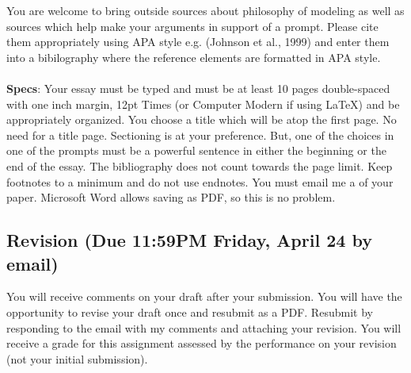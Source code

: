 \documentclass[12pt]{article}
\begin{document}
You are welcome to bring outside sources about philosophy of modeling as well as sources which help make your arguments in support of a prompt. Please cite them appropriately using APA style e.g. (Johnson et al., 1999) and enter them into a bibilography where the reference elements are formatted in APA style.\\
~\\
\textbf{Specs}: Your essay must be typed and must be at least 10 pages double-spaced with one inch margin, 12pt Times (or Computer Modern if using \LaTeX) and be appropriately organized. You choose a title which will be atop the first page. No need for a title page. Sectioning is at your preference. But, one of the choices in one of the prompts must be a powerful sentence in either the beginning or the end of the essay. The bibliography does not count towards the page limit. Keep footnotes to a minimum and do not use endnotes. You must email me a   of your paper. Microsoft Word allows saving as PDF, so this is no problem.

\subsection*{Revision (Due 11:59PM Friday, April 24 by email)}

You will receive comments on your draft after your submission. You will have the opportunity to revise your draft once and resubmit as a PDF. Resubmit by responding to the email with my comments and attaching your revision. You will receive a grade for this assignment assessed by the performance on your revision (not your initial submission).

\end{document}
